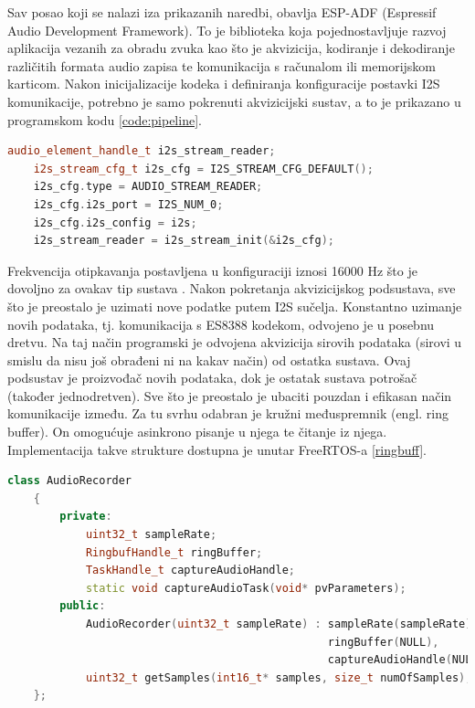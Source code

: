 Sav posao koji se nalazi iza prikazanih naredbi, obavlja ESP-ADF
(Espressif Audio Development Framework). To je biblioteka koja pojednostavljuje
razvoj aplikacija vezanih za obradu zvuka kao što je akvizicija, kodiranje i 
dekodiranje različitih formata audio zapisa te komunikacija s računalom ili 
memorijskom karticom.
Nakon inicijalizacije kodeka i definiranja konfiguracije postavki I2S komunikacije,
potrebno je samo pokrenuti akvizicijski sustav, a to je prikazano
u programskom kodu \ref{code:pipeline}.\\

\begin{lstlisting}[language=C++, caption=Pokretanje akvizicijskog sustava]
    audio_element_handle_t i2s_stream_reader;
    i2s_stream_cfg_t i2s_cfg = I2S_STREAM_CFG_DEFAULT();
    i2s_cfg.type = AUDIO_STREAM_READER;
    i2s_cfg.i2s_port = I2S_NUM_0;
    i2s_cfg.i2s_config = i2s;
    i2s_stream_reader = i2s_stream_init(&i2s_cfg);
\end{lstlisting}
\label{code:pipeline}

Frekvencija otipkavanja postavljena u konfiguraciji iznosi 16000 Hz što
je dovoljno za ovakav tip sustava \cite{wardentinyml}.
Nakon pokretanja akvizicijskog podsustava, sve što je preostalo je uzimati nove
podatke putem I2S sučelja. Konstantno uzimanje novih podataka, tj. komunikacija
s ES8388 kodekom, odvojeno je u posebnu dretvu. Na taj način programski je 
odvojena akvizicija sirovih podataka (sirovi u smislu da nisu još obrađeni ni
na kakav način) od ostatka sustava. Ovaj podsustav je proizvođač novih podataka,
dok je ostatak sustava potrošač (također jednodretven). Sve što je preostalo je
ubaciti pouzdan i efikasan način komunikacije između. Za tu svrhu odabran je
kružni međuspremnik (engl. ring buffer). On omogućuje asinkrono pisanje u njega
te čitanje iz njega. Implementacija takve strukture dostupna je unutar FreeRTOS-a 
\ref{ringbuff}. \\


\begin{lstlisting}[language=C++, caption=Razred AudioRecorder]
    class AudioRecorder
    {
        private:
            uint32_t sampleRate;
            RingbufHandle_t ringBuffer;
            TaskHandle_t captureAudioHandle;
            static void captureAudioTask(void* pvParameters);
        public:
            AudioRecorder(uint32_t sampleRate) : sampleRate(sampleRate), 
                                                 ringBuffer(NULL), 
                                                 captureAudioHandle(NULL) {}
            uint32_t getSamples(int16_t* samples, size_t numOfSamples);
    };
\end{lstlisting}
\label{code:AudioRecorder}

